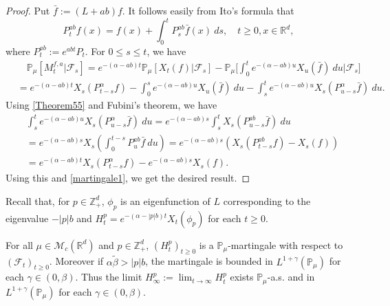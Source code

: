 \documentclass[EJP]{ejpecp} %
\begin{document}
\begin{proof}
  	Put $\bar{f} :=(L+ab)f$.
  	It follows easily from Ito's formula that
\begin{equation}
    \label{Theorem55}
    P_t^{ab}f(x)
    = f(x)+\int_0^t P_s^{ab}\bar{f}(x)~ds,\quad t\geq 0,x\in \mathbb R^d,
\end{equation}
	where $P_t^{ab} := e^{abt}P_t$.
	For $0\leq s\leq t$, we have
\begin{align}
\label{martingale1}
    & \quad\mathbb{P}_{\mu}[M_t^{f,a}|\mathscr{F}_s]
    =e^{-(\alpha-ab)t}\mathbb{P}_{\mu}\left[X_t(f)|\mathscr{F}_s\right]-\mathbb{P}_{\mu}\Big[\int_0^t e^{-(\alpha-ab)u}X_u(\bar{f})~ du\Big|\mathscr{F}_s\big] \\
    & =e^{-(\alpha-ab)t} X_s(P_{t-s}^{\alpha}f)-\int_0^s e^{-(\alpha-ab)u} X_u(\bar{f})~ du - \int_s^t e^{-(\alpha-ab)u}X_s(P_{u-s}^{\alpha} \bar{f})~ du.
\end{align}
  	Using \eqref{Theorem55} and Fubini's theorem, we have
\begin{align}
    & \int_s^t e^{-(\alpha-ab)u}X_s(P_{u-s}^{\alpha} \bar{f})~ du=e^{-(\alpha-ab)s}\int_s^tX_s(P_{u-s}^{ab}\bar{f})~du\\
    & = e^{ - ( \alpha - ab ) s } X_s\left( \int_0^{t-s} P_{u}^{ab} \bar{f}~ du\right)
    = e^{-(\alpha-ab)s}\left(X_s(P_{t-s}^{ab}f) - X_s(f) \right) \\
    & = e^{-(\alpha-ab)t} X_s( P_{t-s}^{\alpha}f) - e^{ - ( \alpha - ab ) s} X_s(f).
\end{align}
	Using this and \eqref{martingale1}, we get the desired result.
\end{proof}

	Recall that, for $p\in \mathbb Z_+^d$,  $\phi_p$ is an eigenfunction of $L$ corresponding to the eigenvalue $-|p|b$ and $ H_t^p =e^{-(\alpha-|p|b)t}X_t(\phi_p)$ for each $t\geq 0$.

\begin{lemma}
\label{lem:M:L:ML}
   	For all $\mu\in \mathcal M_c(\mathbb R^d)$ and $p \in \mathbb Z_+^d$, $(H^p_t)_{t\geq 0}$ is a $\mathbb P_{\mu}$-martingale with respect to $(\mathscr F_t)_{t\geq 0}$.
    Moreover if $\alpha\tilde \beta>|p|b$, the martingale is bounded in $L^{1+\gamma}(\mathbb P_\mu)$ for each $\gamma\in (0, \beta)$.
  	Thus the limit $ H_{\infty}^p := \lim_{t\rightarrow \infty}H_t^p $  exists $\mathbb{P}_{\mu}$-a.s. and in $L^{1+\gamma}(\mathbb{P}_{\mu})$ for each $\gamma \in (0,\beta)$.
\end{lemma}
\end{document}

